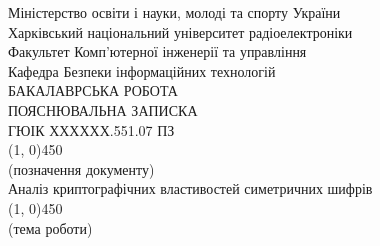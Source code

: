 % 
% 

\begin{titlepage}
    \begin{center}
        Міністерство освіти і науки, молоді та спорту України \\[1ex]
        Харківський національний університет радіоелектроніки \\[1ex] 
        Факультет Комп'ютерної інженерії та управління \\[1ex] 
        Кафедра Безпеки інформаційних технологій \\[2ex] 
        \MakeUppercase{Бакалаврська робота} \\[4ex]
        \MakeUppercase{Пояснювальна записка} \\[1ex]


        \MakeUppercase{ГЮІК ХХХХХХ.551.07 ПЗ} \\[-2ex]
        \line(1, 0){450} \\[-2ex]
        {\scriptsize (позначення документу)} \\[2ex]

        Аналіз криптографічних властивостей симетричних шифрів \\[-2ex]
        \line(1, 0){450} \\[-2ex]
        {\scriptsize (тема роботи)} \\[2ex]


\end{center}
\end{titlepage}

